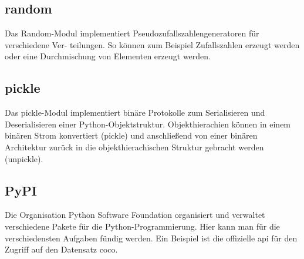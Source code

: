 \subsection{random}

Das Random-Modul implementiert Pseudozufallszahlengeneratoren für verschiedene Ver-
teilungen. So können zum Beispiel Zufallszahlen erzeugt werden oder eine Durchmischung
von Elementen erzeugt werden. \cite{Python:2020e}

\subsection{pickle}

Das pickle-Modul implementiert binäre Protokolle zum Serialisieren und Deserialisieren 
einer Python-Objektstruktur. Objekthierachien können in einem binären Strom konvertiert
(pickle) und anschließend von einer binären Architektur zurück in die objekthierachischen
Struktur gebracht werden (unpickle). \cite{Python:2020d}

\subsection{PyPI}

Die Organisation Python Software Foundation organisiert und verwaltet verschiedene Pakete für die Python-Programmierung. \cite{PyPI:2021} Hier kann man für die verschiedensten Aufgaben fündig werden. Ein Beispiel ist die offizielle \ac{api} für den Zugriff auf den Datensatz \ac{coco}. \cite{PyPI:2021b}



%
%	
